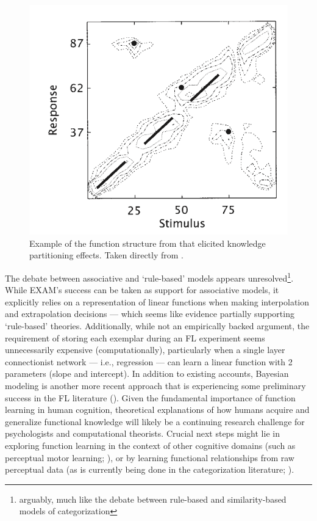 \documentclass[12pt]{article}
\let\oldcite=\cite
\let\oldtextcite=\textcite
\renewcommand{\cite}[1]{\textcolor[rgb]{0, .121, .388}{\oldcite{#1}}}
\renewcommand{\textcite}[1]{\textcolor[rgb]{0, .121, .388}{\oldtextcite{#1}}}
\begin{document}
\begin{figure}[H]
    \centering
    \includegraphics[scale=.4]{figures/knowledgePartitionStruct.png}
    \caption{Example of the function structure from \textcite{kalish2004population} that elicited knowledge partitioning effects. Taken directly from \textcite{kalish2004population}.}
    \label{fig:knowledgePartitionStruct}
\end{figure} 

The debate between associative and `rule-based' models appears unresolved\footnote{arguably, much like the debate between rule-based and similarity-based models of categorization}. While EXAM's success can be taken as support for associative models, it explicitly relies on a representation of linear functions when making interpolation and extrapolation decisions --- which seems like evidence partially supporting `rule-based' theories. Additionally, while not an empirically backed argument, the requirement of storing each exemplar during an FL experiment seems unnecessarily expensive (computationally), particularly when a single layer connectionist network --- i.e., regression --- can learn a linear function with 2 parameters (slope and intercept). In addition to existing accounts, Bayesian modeling is another more recent approach that is experiencing some preliminary success in the FL literature (\cite{lucas2015rational,narain2014structure,wu2020inference}). Given the fundamental importance of function learning in human cognition, theoretical explanations of how humans acquire and generalize functional knowledge will likely be a continuing research challenge for psychologists and computational theorists. Crucial next steps might lie in exploring function learning in the context of other cognitive domains (such as perceptual motor learning; \cite{rosenbaum2001acquisition}), or by learning functional relationships from raw perceptual data (as is currently being done in the categorization literature; \cite{singh2020end}).
\end{document}
